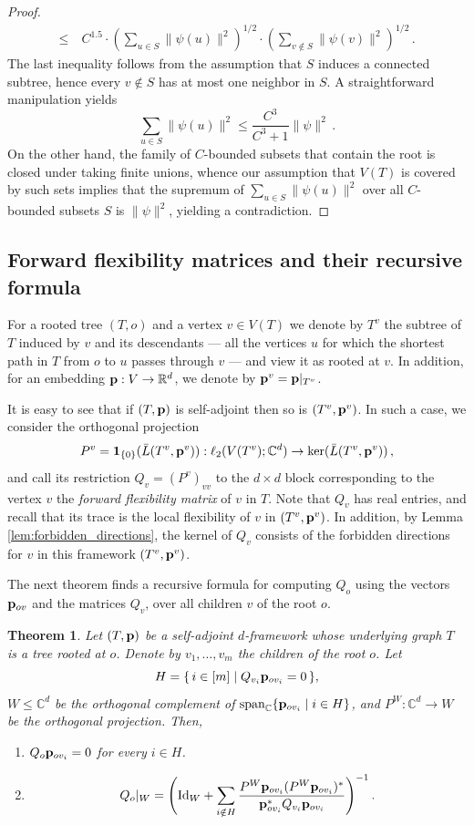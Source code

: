 \documentclass[reqno,english]{amsart}
\numberwithin{equation}{section}
\newtheorem{theorem}{Theorem}[section]
\theoremstyle{definition}{
\newtheorem{example}[theorem]{Example}
\newtheorem{definition}[theorem]{Definition}
\newtheorem*{definition*}{Definition}
\newtheorem{problem}[theorem]{Problem}
\newtheorem{question}[theorem]{Question}
}
\newcommand{\R}{\mathbb R}
\newcommand{\C}{\mathbb C}
\newcommand{\p}{{\bf p}}
\newcommand{\Id}{\mathrm{Id}}
\begin{document}
\begin{proof}
\begin{align*}
            \leq~
            & C^{1.5}\cdot \left(\sum_{u\in S} \|\psi(u)\|^2\right)^{1/2}\cdot\left(\sum_{v\notin S}\|\psi(v)\|^2\right)^{1/2}\,.
        \end{align*}
    The last inequality follows from the assumption that $S$ induces a connected subtree, hence every $v\notin S$ has at most one neighbor in $S$. A straightforward manipulation yields
        \[
        \sum_{u\in S}\|\psi(u)\|^2 \leq \frac{C^3}{C^3+1}\|\psi\|^2\,.   
        \]
    On the other hand, the family of $C$-bounded subsets that contain the root is closed under taking finite unions, whence our assumption that $V(T)$ is covered by such sets implies that the supremum of $\sum_{u\in S}\|\psi(u)\|^2$ over all $C$-bounded subsets $S$ is $\|\psi\|^2$, yielding a contradiction.
\end{proof}

\subsection{Forward flexibility matrices and their recursive formula}\label{sec:recursive}

For a rooted tree $(T,o)$ and a vertex $v\in V(T)$ we denote by $T^v$ the subtree of $T$ induced by $v$ and its descendants --- all the vertices $u$ for which the shortest path in $T$ from $o$ to $u$ passes through $v$ --- 
and view it as rooted at $v$. 
In addition, for an embedding $\p:V\to \R^d$, we denote by $\p^v=\p|_{T^v}$. 

It is easy to see that if $(T,\p)$ is self-adjoint then so is $(T^v,\p^v)$. In such a case, we consider the orthogonal projection
\[
P^v=\mathbf 1_{\{0\}}(\bar L(T^v,\p^v)):\ell_2(V(T^v);\C^d)\to\ker(\bar L(T^v,\p^v))\,,
\]
and call its restriction $Q_v=(P^v)_{vv}$ to the $d\times d$ block corresponding to the vertex $v$ the {\em forward flexibility matrix} of $v$ in $T$.
Note that $Q_v$ has real entries, and recall that its trace is the local flexibility of $v$ in $(T^v,\p^v)$. 
In addition, by Lemma \ref{lem:forbidden_directions}, the kernel of $Q_v$ consists of the forbidden directions for $v$ in this framework $(T^v,\p^v)$.

The next theorem finds a recursive formula for computing $Q_o$ using the vectors $\p_{ov}$ and the matrices $Q_v$, over all children $v$ of the root $o$.

\begin{theorem}\label{thm:recursion}
Let $(T,\p)$ be a self-adjoint $d$-framework whose underlying graph $T$ is a tree rooted at $o$. Denote by
$v_1,\dots,v_m$ the children of the root $o$. Let
\[
H=\{\,i\in[m]\mid Q_{v_i}\p_{ov_i}=0\,\},
\]
$W\le \C^d$ be the orthogonal complement of
$\mathrm{span}_{\C}\{\p_{ov_i}\mid i\in H\}$, and $P^W:\C^d\to W$ be the orthogonal projection. Then,
\begin{enumerate}
\item $Q_o\p_{ov_i}=0$ for every $i\in H$.
\item
\[
Q_o|_W
=
\left(
\Id_W+\sum_{i\notin H}\frac{P^W\p_{ov_i}(P^W\p_{ov_i})^*}{\p_{ov_i}^*Q_{v_i}\p_{ov_i}}
\right)^{-1}.
\]
\end{enumerate}
\end{theorem}
\end{document}
